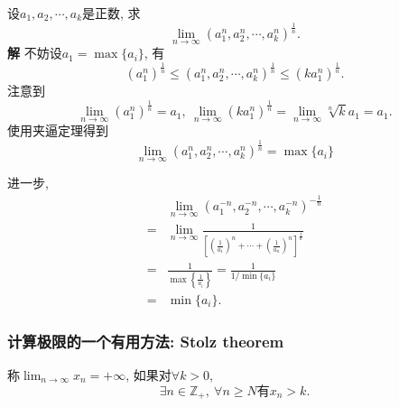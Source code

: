 \begin{example}
  设$a_1,a_2,\cdots,a_k$是正数, 求
  \begin{equation}
    \lim_{n \to \infty} \left( a^n_1,a^n_2,\cdots,a^n_k \right)^{\frac{1}{n}}. 
  \end{equation}
  \textbf{解} 不妨设$a_1=\max \{ a_i \}$, 有
  \begin{equation}
    \left( a_1^{n} \right) ^{\frac{1}{n}} \le \left( a^n_1,a^n_2,\cdots,a^n_k \right) ^{\frac{1}{n}} \le \left( k a_1^{n} \right) ^{\frac{1}{n}}.
  \end{equation}
  注意到
  \begin{equation}
    \lim_{n \to \infty} \left( a_1^{n} \right) ^{\frac{1}{n}} = a_1, \ \lim_{n \to \infty}\left( k a_1^{n} \right) ^{\frac{1}{n}} = \lim_{n \to \infty} \sqrt[n]{k} a_1 = a_1.
  \end{equation}
  使用夹逼定理得到
  \begin{equation}
    \lim_{n \to \infty} \left( a^n_1,a^n_2,\cdots,a^n_k \right)^{\frac{1}{n}} = \max \{ a_i \}
  \end{equation}
\end{example}

\begin{example}
  进一步,
  \begin{align}
    & \lim_{n \to \infty} \left( a^{-n}_1,a^{-n}_2,\cdots,a^{-n}_k \right) ^{-\frac{1}{n}}
    \\
    = & \lim_{n \to \infty} \frac{1}{\left[ \left( \frac{1}{a_1} \right) ^{n} + \cdots + \left( \frac{1}{a_n} \right) ^{n} \right] ^{\frac{1}{n}}}
    \\
    = & \frac{1}{\max\left\{ \frac{1}{a_i} \right\}} = \frac{1}{1 / \min \{ a_i \}} 
    \\
    = & \min \{ a_i \}.
  \end{align}
\end{example}

\subsubsection[Stolz 定理]{计算极限的一个有用方法: Stolz theorem}
\begin{definition}
    称$\displaystyle \lim_{n \to \infty}x_n = +\infty$, 如果对$\forall k>0$,
    \begin{equation}
      \exists n\in \mathbb{Z}_{+} ,\ \forall n\ge N \text{有} x_n>k.
    \end{equation}
\end{definition}

